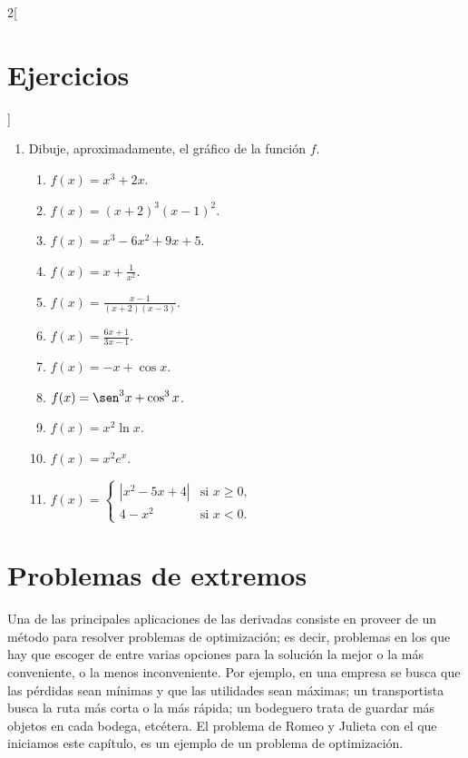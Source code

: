 \begin{multicols}{2}[\section{Ejercicios}]
\begingroup
\small
\begin{enumerate}[leftmargin=*]
\item Dibuje, aproximadamente, el gráfico de la función $f$.
    \begin{enumerate}
    \item $\displaystyle f(x) = x^3 + 2x$.
    \item $\displaystyle f(x) = (x + 2)^3(x - 1)^2$.
    \item $\displaystyle f(x) = x^3 - 6x^2 + 9x + 5$.
    \item $\displaystyle f(x) = x + \frac{1}{x^2}$.
    \item $\displaystyle f(x) = \frac{x - 1}{(x + 2)(x - 3)}$.
    \item $\displaystyle f(x) = \frac{6x + 1}{3x - 1}$.
    \item $\displaystyle f(x) = -x + \cos x$.
    \item $\displaystyle f(x) = \sen^3 x + \cos^3 x$.
    \item $\displaystyle f(x) = x^2\ln x$.
    \item $\displaystyle f(x) = x^2e^x$.
    \item $\displaystyle f(x) = 
    \begin{cases} 
    |x^2-5x+4| & \text{si $x\geq 0$,}\\
    4-x^2 & \text{si $x< 0$.}
    \end{cases}$
    \end{enumerate}
\end{enumerate}
\endgroup
\end{multicols}

\section{Problemas de extremos}

Una de las principales aplicaciones de las derivadas consiste en proveer de un método para resolver
problemas de optimización; es decir, problemas en los que hay que escoger de entre varias opciones
para la solución la mejor o la más conveniente, o la menos inconveniente. Por ejemplo, en una
empresa se busca que las pérdidas sean mínimas y que las utilidades sean máximas; un transportista
busca la ruta más corta o la más rápida; un bodeguero trata de guardar más objetos en cada bodega,
etcétera. El problema de Romeo y Julieta con el que iniciamos este capítulo, es un ejemplo de un
problema de optimización.

